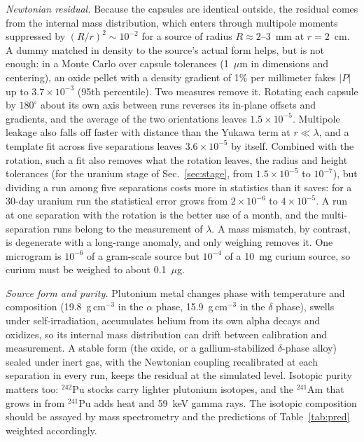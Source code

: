 \documentclass[aps,prd,onecolumn,superscriptaddress,floatfix,nofootinbib]{revtex4-2}
\newcommand{\Pu}[1]{$^{#1}$Pu}
\newcommand{\nuc}[2]{$^{#1}$#2}
\begin{document}
\textit{Newtonian residual.} Because the capsules are identical outside, the residual comes from the internal mass
distribution, which enters through multipole moments suppressed by $(R/r)^2\sim10^{-2}$ for a source of radius
$R\approx2$--$3$~mm at $r=2$~cm. A dummy matched in density to the source's actual form helps, but is not enough: in
a Monte Carlo over capsule tolerances (1~$\mu$m in dimensions and centering), an oxide pellet with a density gradient
of 1\% per millimeter fakes $|P|$ up to $3.7\times10^{-3}$ (95th percentile). Two measures remove it. Rotating each
capsule by $180^\circ$ about its own axis between runs reverses its in-plane offsets and gradients, and the average
of the two orientations leaves $1.5\times10^{-5}$. Multipole leakage also falls off faster with distance than the
Yukawa term at $r\ll\lambda$, and a template fit across five separations leaves $3.6\times10^{-5}$ by itself.
Combined with the rotation, such a fit also removes what the rotation leaves, the radius and height tolerances (for
the uranium stage of Sec.~\ref{sec:stage}, from $1.5\times10^{-5}$ to $10^{-7}$), but dividing a run among five
separations costs more in statistics than it saves: for a 30-day uranium run the statistical error grows from
$2\times10^{-6}$ to $4\times10^{-5}$. A run at one separation with the rotation is the better use of a month, and the
multi-separation runs belong to the measurement of $\lambda$. A mass mismatch, by contrast, is degenerate with a
long-range anomaly, and only weighing removes it. One microgram is $10^{-6}$ of a gram-scale source but $10^{-4}$ of a 10~mg curium source, so curium must be
weighed to about 0.1~$\mu$g.

\textit{Source form and purity.} Plutonium metal changes phase with temperature and composition (19.8~g\,cm$^{-3}$
in the $\alpha$ phase, 15.9~g\,cm$^{-3}$ in the $\delta$ phase), swells under self-irradiation, accumulates helium
from its own alpha decays and oxidizes, so its internal mass distribution can drift between calibration and
measurement. A stable form (the oxide, or a gallium-stabilized $\delta$-phase alloy) sealed under inert gas, with
the Newtonian coupling recalibrated at each separation in every run, keeps the residual at the simulated level. Isotopic
purity matters too: \Pu{242} stocks carry lighter plutonium isotopes, and the \nuc{241}{Am} that grows in from
\nuc{241}{Pu} adds heat and 59~keV gamma rays. The isotopic composition should be assayed by mass spectrometry and
the predictions of Table~\ref{tab:pred} weighted accordingly.
\end{document}

